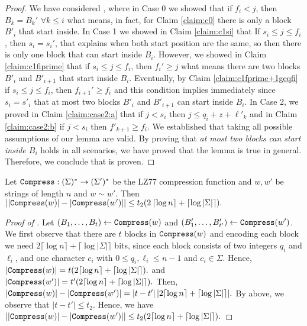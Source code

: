 \begin{proof}
We have considered , where in Case 0 we showed that if $f_i<j$, then $B_k=B_k'\,\,\forall k\leq i$ what means, in fact, for Claim \ref{claim:c0}  there is only a block $B'_i$ that start inside.
In Case 1 we showed in Claim \ref{claim:c1si} that If $s_i\leq j\leq f_i$, then $s_i=s_i'$, that explains when both start position are the same, so then there is only one block that can start inside $B_i$. However, we showed in Claim \ref{claim:c1fiprime} that if $s_i\leq j\leq f_i$, then $f_i'\geq j$ what means there are two blocks $B'_i$ and $B'_{i+1}$ that start inside $B_i$. Eventually, by Claim \ref{claim:c1fprime+1geqfi} if $s_i\leq j\leq f_i$, then $f_{i+1}'\geq f_i$ and this condition implies immediately since $s_i=s'_i$ that at most two blocks $B'_i$ and $B'_{i+1}$ can start inside $B_i$.
In Case 2, we proved in Claim \ref{claim:case2:a} that if $j<s_i$ then $j \leq q_i+z+\ell'_k$ and in Claim \ref{claim:case2:b} if $j<s_i$ then $f'_{k+1}\geq f_i$. We established that taking all possible assumptions of our lemma are valid. By proving that \emph{at most two blocks can start inside $B_i$} holds in all scenarios, we have proved that the lemma is true in general.
Therefore, we conclude that  is proven.
\end{proof}



\newcommand{\claimGSstatement}{
Let $\compress:(\Sigma)^*\rightarrow(\Sigma')^*$ be the LZ77 compression function  and $w,w'$ be strings of length $n$ and $w\sim w'$. Then
    $\left| \left| \compress(w) \right| - \left| \compress(w') \right| \right| \leq  t_2(2\left\lceil \log n \right \rceil + \left\lceil \log |\Sigma|\right \rceil).$
}
\begin{claim}
\claimGSstatement
\end{claim}

\begin{proof}[Proof of {}]
Let $(B_1,\ldots,B_t)\gets\mathtt{Compress}(w)$ and $(B_1',\ldots,B_{t'}')\gets\mathtt{Compress}(w')$. 
We first observe that there are $t$ blocks in $\mathtt{Compress}(w)$ and encoding each block we need $2 \lceil\log n\rceil + \lceil\log|\Sigma|\rceil$ bits, since each block consists of two integers $q_i$ and $\ell_i$, and one character $c_i$ with $0\leq q_i,\ell_i\leq n-1$ and $c_i\in\Sigma$. Hence, $|\mathtt{Compress}(w)| = t(2\lceil\log n\rceil + \lceil\log|\Sigma|\rceil).$ and 
$|\mathtt{Compress}(w')| = t'(2\lceil\log n\rceil + \lceil\log|\Sigma|\rceil).$
Then,     $\left| \mathtt{Compress}(w) \right| - \left| \mathtt{Compress}(w') \right| =\left|t-t'\right||2\lceil\log n\rceil + \lceil\log|\Sigma|\rceil|.$ By  above, we observe that $|t-t'|\leq t_2$. Hence, we have $\left|\left| \mathtt{Compress}(w) \right| - \left| \mathtt{Compress}(w') \right|\right|\leq t_2(2\lceil\log n\rceil + \lceil\log|\Sigma|\rceil).$
\end{proof}

